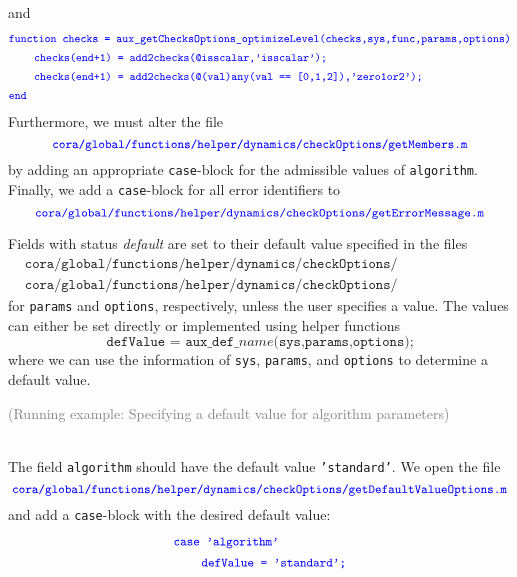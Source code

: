 \begin{tcolorbox}
and
\begin{align*}
	&		\textcolor{blue}{\small{\texttt{function checks = aux\_getChecksOptions\_optimizeLevel(checks,sys,func,params,options)}}} \\
	&\qquad \textcolor{blue}{\small{\texttt{checks(end+1) = add2checks(@isscalar,'isscalar');}}} \\
	&\qquad \textcolor{blue}{\small{\texttt{checks(end+1) = add2checks(@(val)any(val == [0,1,2]),'zero1or2');}}} \\
	&		\textcolor{blue}{\small{\texttt{end}}}
\end{align*}
Furthermore, we must alter the file
\begin{equation*}
	\textcolor{blue}{\small{\texttt{cora/global/functions/helper/dynamics/checkOptions/getMembers.m}}}
\end{equation*}
by adding an appropriate \texttt{case}-block for the admissible values of \texttt{algorithm}.
Finally, we add a \texttt{case}-block for all error identifiers to
\begin{equation*}
	\textcolor{blue}{\small{\texttt{cora/global/functions/helper/dynamics/checkOptions/getErrorMessage.m}}}
\end{equation*}
\end{tcolorbox}


Fields with status \textit{default} are set to their default value specified in the files
\begin{align*}
	&\texttt{cora/global/functions/helper/dynamics/checkOptions/getDefaultValueParams.m} \\
	&\texttt{cora/global/functions/helper/dynamics/checkOptions/getDefaultValueOptions.m}
\end{align*}
for \texttt{params} and \texttt{options}, respectively, unless the user specifies a value.
The values can either be set directly or implemented using helper functions
\begin{equation*}
	\texttt{defValue = aux\_def\_}\textit{name}\texttt{(sys,params,options);}
\end{equation*}
where we can use the information of \texttt{sys}, \texttt{params}, and \texttt{options} to determine a default value.


\begin{tcolorbox}
	\begin{scriptsize} \textcolor{gray}{(Running example: Specifying a default value for algorithm parameters)} \end{scriptsize} \\
	The field \texttt{algorithm} should have the default value \texttt{'standard'}.
	We open the file
	\begin{equation*}
		\textcolor{blue}{\small{\texttt{cora/global/functions/helper/dynamics/checkOptions/getDefaultValueOptions.m}}}
	\end{equation*}
	and add a \texttt{case}-block with the desired default value:
	\begin{align*}
		&\textcolor{blue}{\small{\texttt{case 'algorithm'}}} \\
		&\qquad \textcolor{blue}{\small{\texttt{defValue = 'standard';}}}
	\end{align*}
\end{tcolorbox}


